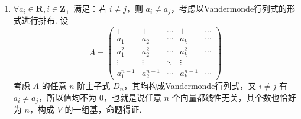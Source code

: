 \begin{enumerate}
    \item $\forall a_i \in \mathbf{R}, i \in \mathbf{Z}_{+}$ 满足：若 $i \neq j$，则 $a_i \neq a_j$，考虑以Vandermonde行列式的形式进行排布. 设
          \[ A = \begin{pmatrix}
                  1         & 1         & \cdots & 1         & \cdots \\
                  a_1       & a_2       & \cdots & a_k       & \cdots \\
                  a_1^2     & a_2^2     & \cdots & a_k^2     & \cdots \\
                  \vdots    & \vdots    & \ddots & \vdots    &        \\
                  a_1^{n-1} & a_2^{n-1} & \cdots & a_k^{n-1} & \cdots
              \end{pmatrix}\]
          考虑 $A$ 的任意 $n$ 阶主子式 $D_n$，其均构成Vandermonde行列式，又 $i \neq j$ 有 $a_i \neq a_j$，所以值均不为 0，也就是说任意 $n$ 个向量都线性无关，其个数也恰好为 $n$，构成 $V$ 的一组基，命题得证.
\end{enumerate}


